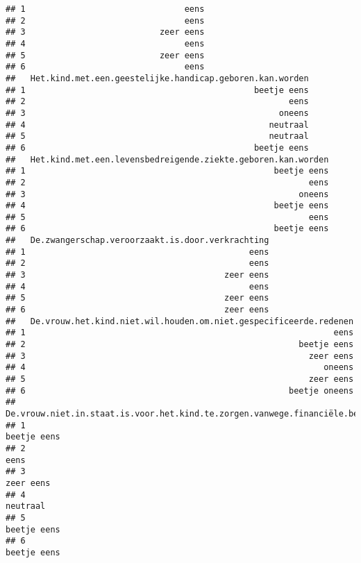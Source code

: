 \documentclass[
]{article}
\begin{document}
\begin{verbatim}
## 1                                eens
## 2                                eens
## 3                           zeer eens
## 4                                eens
## 5                           zeer eens
## 6                                eens
##   Het.kind.met.een.geestelijke.handicap.geboren.kan.worden
## 1                                              beetje eens
## 2                                                     eens
## 3                                                   oneens
## 4                                                 neutraal
## 5                                                 neutraal
## 6                                              beetje eens
##   Het.kind.met.een.levensbedreigende.ziekte.geboren.kan.worden
## 1                                                  beetje eens
## 2                                                         eens
## 3                                                       oneens
## 4                                                  beetje eens
## 5                                                         eens
## 6                                                  beetje eens
##   De.zwangerschap.veroorzaakt.is.door.verkrachting
## 1                                             eens
## 2                                             eens
## 3                                        zeer eens
## 4                                             eens
## 5                                        zeer eens
## 6                                        zeer eens
##   De.vrouw.het.kind.niet.wil.houden.om.niet.gespecificeerde.redenen
## 1                                                              eens
## 2                                                       beetje eens
## 3                                                         zeer eens
## 4                                                            oneens
## 5                                                         zeer eens
## 6                                                     beetje oneens
##   De.vrouw.niet.in.staat.is.voor.het.kind.te.zorgen.vanwege.financiële.beperkingen
## 1                                                                      beetje eens
## 2                                                                             eens
## 3                                                                        zeer eens
## 4                                                                         neutraal
## 5                                                                      beetje eens
## 6                                                                      beetje eens

\end{verbatim}
\end{document}
